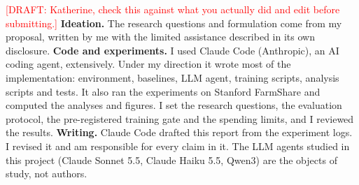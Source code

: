 \documentclass{article} %
\begin{document}
\textcolor{red}{[DRAFT: Katherine, check this against what you actually did and edit before
submitting.]}
\textbf{Ideation.} The research questions and formulation come from my proposal, written by me
with the limited assistance described in its own disclosure.
\textbf{Code and experiments.} I used Claude Code (Anthropic), an AI coding agent, extensively.
Under my direction it wrote most of the implementation: environment, baselines, LLM agent,
training scripts, analysis scripts and tests. It also ran the experiments on Stanford FarmShare
and computed the analyses and figures. I set the research questions, the evaluation protocol,
the pre-registered training gate and the spending limits, and I reviewed the results.
\textbf{Writing.} Claude Code drafted this report from the experiment logs. I revised it and am
responsible for every claim in it. The LLM agents studied in this project (Claude Sonnet 5.5,
Claude Haiku 5.5, Qwen3) are the objects of study, not authors.
\end{document}
